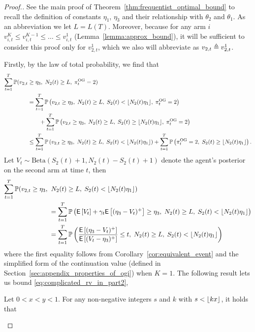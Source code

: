 \begin{proof}[Proof.]
	See the main proof of Theorem~\ref{thm:frequentist_optimal_bound} to recall the definition of constants $\eta_1$, $\eta_3$ and their relationship with $\theta_2$ and $\theta_1$. As an abbreviation we let $L = L(T)$. Moreover, because for any arm $i$ $v^K_{i,t} \le v^{K-1}_{i,t} \le \ldots \le v^1_{i,t}$ (Lemma~\ref{lemma:approx_bound}), it will be sufficient to consider this proof only for $v^1_{2,t}$, which we also will abbreviate as $v_{2,t} \triangleq v^1_{2,t}$.
	
	Firstly, by the law of total probability, we find that
	\begin{align} 
	\sum_{t=1}^T \mathbb{P}(v_{2,t} & \ge \eta_3 ,\; N_2(t) \ge L,\; \pi^{\rm OG}_t = 2) \nonumber \\
	& = \sum_{t=1}^T \mathbb{P} \left( v_{2,t} \ge \eta_3 ,\; N_2(t) \ge L, \; S_2(t) < \lfloor N_2(t) \eta_1\rfloor, \; \pi^{\rm OG}_t = 2 \right) \nonumber \\
	& \qquad + \sum_{t=1}^T \mathbb{P} \left( v_{2,t} \ge \eta_3 ,\; N_2(t) \ge L, \; S_2(t) \ge \lfloor N_2(t) \eta_1\rfloor,\; \pi^{\rm OG}_t = 2 \right) \nonumber \\
	& \le \sum_{t=1}^T \mathbb{P} \left( v_{2,t} \ge \eta_3 ,\; N_2(t) \ge L, \; S_2(t) < \lfloor N_2(t) \eta_1\rfloor \right) + \sum_{t=1}^T \mathbb{P} \left( \pi^{\rm OG}_t = 2,\; S_2(t) \ge \lfloor N_2(t) \eta_1\rfloor \right) \label{eqn:splitting_not_underestimate}.
	\end{align}
	Let $V_t \sim \text{Beta}(S_2(t) + 1, N_2(t)- S_2(t) + 1)$ denote the agent's posterior on the second arm at time $t$, then
	\begin{align}
	\sum_{t=1}^T \mathbb{P}(v_{2,t} \ge \eta_3 ,\; & \; N_2(t) \ge L,\; S_2(t) < \lfloor N_2(t) \eta_1\rfloor)  \nonumber\\
	& = \sum_{t=1}^T \mathbb{P} \left( \mathsf{E} \left[ V_t \right] + \gamma_t \mathsf{E} \left[ (\eta_3 - V_t)^+ \right] \ge \eta_3, \; N_2(t) \ge L,\; S_2(t) < \lfloor N_2(t) \eta_1\rfloor \right) \nonumber \\
	& = \sum_{t=1}^T \mathbb{P} \left( \frac{\mathsf{E} \left[ (\eta_3-V_t)^+  \right]}{  \mathsf{E} \left[ (V_t - \eta_3)^+  \right]} \le t , \; N_2(t) \ge L,\; S_2(t) < \lfloor N_2(t) \eta_1\rfloor \right) \label{eq:complicated_rv_in_part2}
	\end{align}
	where the first equality follows from Corollary~\ref{cor:equivalent_event} and the simplified form of the continuation value (defined in Section~\ref{sec:appendix_properties_of_ogi}) when $K = 1$. The following result lets us bound \eqref{eq:complicated_rv_in_part2},
	\begin{lemma} \label{lem:lb_rv2}
		Let $0 < x < y < 1$. For any non-negative integers $s$ and $k$ with $s < \lfloor kx\rfloor$, it holds that

\end{lemma}
\end{proof}
